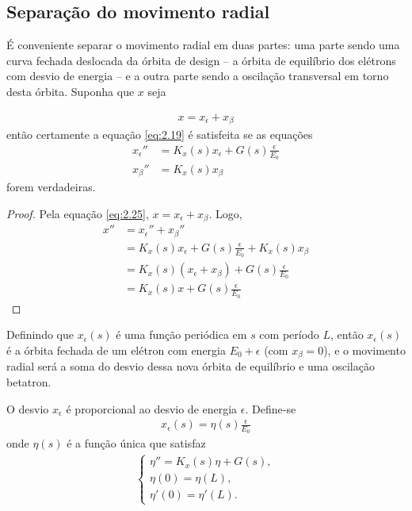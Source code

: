 \subsection{Separação do movimento radial}
É conveniente separar o movimento radial em duas partes: uma parte sendo uma curva fechada deslocada da órbita de design -- a órbita de equilíbrio dos elétrons com desvio de energia -- e a outra parte sendo a oscilação transversal em torno desta órbita. Suponha que $x$ seja
	
\begin{align}
	x = x_{\epsilon} + x_{\beta}\label{eq:2.25}
\end{align}
então certamente a equação \eqref{eq:2.19} é satisfeita se as equações
\begin{align}
	x_\epsilon'' &= K_x(s)x_\epsilon + G(s)\frac{\epsilon}{E_0}\label{eq:2.26}\\
	x_\beta'' &= K_x(s)x_\beta\label{eq:2.27}
\end{align}
forem verdadeiras.
	
\begin{proof}
    Pela equação \eqref{eq:2.25}, $x = x_{\epsilon} + x_{\beta}$. Logo,
    \begin{align*}
        x'' &= x_{\epsilon}'' + x_{\beta}''\\
            &= K_x(s)x_\epsilon + G(s)\frac{\epsilon}{E_0} + K_x(s)x_\beta\\
            &= K_x(s)(x_\epsilon + x_\beta) + G(s)\frac{\epsilon}{E_0}\\
            &= K_x(s)x + G(s)\frac{\epsilon}{E_0}
    \end{align*}
\end{proof}
	
Definindo que $x_\epsilon(s)$ é uma função periódica em $s$ com período $L$, então $x_\epsilon(s)$ é a órbita fechada de um elétron com energia $E_0 + \epsilon$ (com $x_\beta=0$), e o movimento radial será a soma do desvio dessa nova órbita de equilíbrio e uma oscilação betatron.
	
O desvio $x_\epsilon$ é proporcional ao desvio de energia $\epsilon$. Define-se	
\begin{align}
	x_\epsilon(s) = \eta(s)\frac{\epsilon}{E_0}\label{eq:2.29}
\end{align}
onde $\eta(s)$ é a função única que satisfaz	
\begin{align}
	\begin{cases}
		\eta'' = K_x(s)\eta + G(s), \\
        \eta(0) = \eta(L), \\
        \eta'(0) = \eta'(L).
    \end{cases}
\end{align}
	
